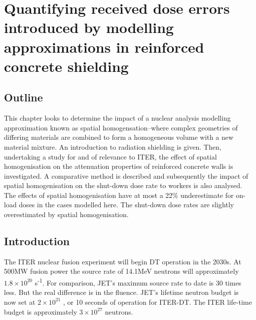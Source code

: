 
\chapter{Quantifying received dose errors introduced by modelling approximations in reinforced concrete shielding}
\label{chap:homogenisation}

\ifpdf
    \graphicspath{{Chapter2/Figs/Raster/}{Chapter2/Figs/PDF/}{Chapter2/Figs/}}
\else
    \graphicspath{{Chapter2/Figs/Vector/}{Chapter2/Figs/}}
\fi


\section{Outline}
This chapter looks to determine the impact of a nuclear analysis modelling approximation known as spatial homogensation--where complex geometries of differing materials are combined to form a homogeneous volume with a new material mixture. An introduction to radiation shielding is given. Then, undertaking a study for and of relevance to ITER, the effect of spatial homogenisation on the attenuation properties of reinforced concrete walls is investigated. A comparative method is described and subsequently the impact of spatial homogenisation on the shut-down dose rate to workers is also analysed. The effects of spatial homogenisation have at most a 22\% underestimate for on-load doses in the cases modelled here. The shut-down dose rates are slightly overestimated by spatial homogenisation.

\section{Introduction}
The ITER nuclear fusion experiment will begin DT operation in the 2030s. At 500MW fusion power the source rate of 14.1MeV neutrons will approximately $1.8\times10^{20}$ s\textsuperscript{-1}. For comparison, JET's maximum source rate to date is 30 times less. But the real difference is in the fluence. JET's lifetime neutron budget is now set at $2\times10^{21}$ \cite{Lobel2008}, or 10 seconds of operation for ITER-DT. The ITER life-time budget is approximately $3\times10^{27}$ neutrons.

